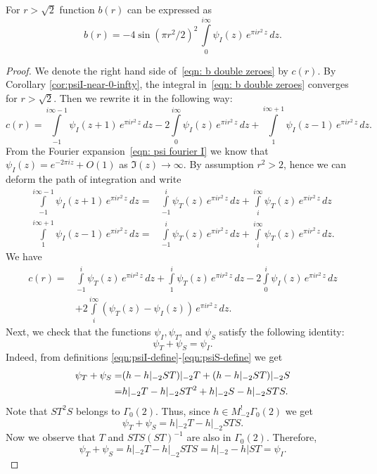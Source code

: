 \begin{proposition}\label{prop:b-double-zeros}
For $r>\sqrt{2}$ function $b(r)$ can be expressed as
\begin{equation}\label{eqn: b double zeroes}
    b(r)=-4\sin(\pi r^2/2)^2\,\int\limits_{0}^{i\infty}\psi_I(z)\,e^{\pi i r^2 \,z}\,dz.
\end{equation}
\end{proposition}
\begin{proof}
We denote the right hand side of~\eqref{eqn: b double zeroes} by $c(r)$.
By Corollary \ref{cor:psiI-near-0-infty}, the integral in~\eqref{eqn: b double zeroes} converges for $r>\sqrt{2}$.
Then we rewrite it in the following way:
$$c(r)=\int\limits_{-1}^{i\infty-1}\psi_I(z+1)\,e^{\pi i r^2 \,z}\,dz-2\int\limits_{0}^{i\infty}\psi_I(z)\,e^{\pi i r^2 \,z}\,dz+
\int\limits_{1}^{i\infty+1}\psi_I(z-1)\,e^{\pi i r^2 \,z}\,dz.$$
From the Fourier expansion~\eqref{eqn: psi fourier I} we know that $\psi_I(z)=e^{-2\pi i z}+O(1)$ as $\Im(z)\to\infty$.
By assumption $r^2>2$, hence we can deform the path of integration and write
\begin{align}\label{eqn: inside proof 1}
\int\limits_{-1}^{i\infty-1}\psi_I(z+1)\,e^{\pi i r^2 \,z}\,dz=&
\int\limits_{-1}^{i}\psi_T(z)\,e^{\pi i r^2 \,z}\,dz+\int\limits_{i}^{i\infty}\psi_T(z)\,e^{\pi i r^2 \,z}\,dz\\
\int\limits_{1}^{i\infty+1}\psi_I(z-1)\,e^{\pi i r^2 \,z}\,dz=&
\int\limits_{-1}^{i}\psi_T(z)\,e^{\pi i r^2 \,z}\,dz+\int\limits_{i}^{i\infty}\psi_T(z)\,e^{\pi i r^2 \,z}\,dz.
\end{align}
We have
\begin{align}\label{eqn: c1}c(r)=&\int\limits_{-1}^{i}\psi_T(z)\,e^{\pi i r^2 \,z}\,dz+\int\limits_{1}^{i}\psi_T(z)\,e^{\pi i r^2 \,z}\,dz
-2\int\limits_{0}^{i}\psi_I(z)\,e^{\pi i r^2 \,z}\,dz\\
&+2\int\limits_{i}^{i\infty}(\psi_T(z)-\psi_I(z))\,e^{\pi i r^2 \,z}\,dz.\nonumber
    \end{align}
Next, we check that the functions $\psi_I,\psi_T$, and $\psi_S$ satisfy the following identity:
\begin{equation}\label{eqn: c2}\psi_T+\psi_S=\psi_I.\end{equation}
Indeed, from definitions \eqref{eqn:psiI-define}-\eqref{eqn:psiS-define} we get
\begin{align}\psi_T+\psi_S=&(h-h|_{-2}ST)|_{-2}T+(h-h|_{-2}ST)|_{-2}S\notag\\
=&h|_{-2}T-h|_{-2}ST^2+h|_{-2}S-h|_{-2}STS.\notag\end{align}
Note that $ST^2S$ belongs to $\Gamma_0(2)$. Thus, since $h\in M^!_{-2}\Gamma_0(2)$ we get
$$\psi_T+\psi_S=h|_{-2}T-h|_{-2}STS. $$
Now we observe that $T$ and $STS(ST)^{-1}$ are also in $\Gamma_0(2)$. Therefore,
$$\psi_T+\psi_S=h|_{-2}T-h|_{-2}STS=h|_{-2}-h|ST=\psi_I.$$


\end{proof}

